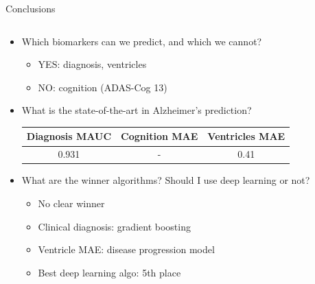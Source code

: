 \documentclass[8pt,xcolor=table,aspectratio=169]{beamer}
\begin{document}
% 
% 
% 



\begin{frame}{Conclusions}
 
\begin{columns}[t]
\begin{column}[t]{0.5\textwidth}
\begin{itemize}
   \item Which biomarkers can we predict, and which we cannot? 
  
  \begin{itemize}
  \item YES: diagnosis, ventricles
  \item NO: cognition (ADAS-Cog 13)
\end{itemize}    
  
  \vspace{2em}
   
 
   \item What is the state-of-the-art in Alzheimer's prediction?
  
  \begin{tabular}{|c | c | c|}
  \hline
  Diagnosis MAUC & Cognition MAE & Ventricles MAE\\
  \hline
  0.931 & - & 0.41\\
  \hline
  \end{tabular}
  
  
  \vspace{2em}
  
   \item What are the winner algorithms? Should I use deep learning or not?
  
  \begin{itemize}
  \item No clear winner
   \item Clinical diagnosis: gradient boosting
   \item Ventricle MAE: disease progression model
   \item Best deep learning algo: 5th place
  \end{itemize}
  

\end{itemize}
\end{column}
\end{columns}
\end{frame}
\end{document}
